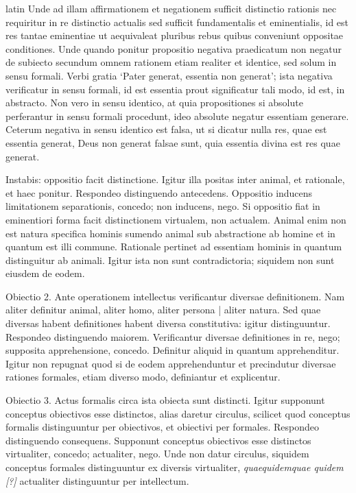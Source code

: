 \begin{otherlanguage*}{latin}
\pstart
 Unde ad illam affirmationem et negationem sufficit distinctio rationis nec requiritur in re distinctio actualis sed sufficit fundamentalis et eminentialis, id est res tantae eminentiae ut aequivaleat pluribus rebus quibus conveniunt oppositae conditiones. Unde quando ponitur propositio negativa  praedicatum non negatur de subiecto secundum omnem rationem etiam realiter et identice, sed solum in sensu formali. Verbi gratia `Pater generat, essentia non generat'; ista negativa verificatur in sensu formali, id est essentia prout significatur tali modo, id est, in abstracto. Non vero in sensu identico, at quia propositiones si absolute perferantur in sensu formali procedunt, ideo absolute negatur essentiam generare. Ceterum negativa in sensu identico est falsa, ut si dicatur nulla res, quae est essentia generat, Deus non generat falsae sunt, quia essentia divina est res quae generat. 
\pend

\pstart
 Instabis: oppositio facit distinctione. Igitur illa positas inter animal, et rationale, et haec ponitur. Respondeo distinguendo antecedens. Oppositio inducens limitationem separationis, concedo; non inducens, nego. Si oppositio fiat in eminentiori forma facit distinctionem virtualem, non actualem. Animal enim non est natura specifica hominis sumendo animal sub abstractione ab homine et in quantum est illi commune. Rationale pertinet ad essentiam hominis in quantum distinguitur ab animali. Igitur ista non sunt contradictoria; siquidem non sunt eiusdem de eodem. 
\pend

\pstart
 Obiectio 2. Ante operationem intellectus verificantur diversae definitionem. Nam aliter definitur animal, aliter homo, aliter persona \textnormal{|} aliter natura. Sed quae diversas habent definitiones habent diversa constitutiva: igitur distinguuntur. Respondeo distinguendo maiorem. Verificantur diversae definitiones in re, nego; supposita apprehensione, concedo. Definitur aliquid in quantum apprehenditur. Igitur non repugnat quod si de eodem apprehenduntur et precindutur diversae rationes formales, etiam diverso modo, definiantur et explicentur. 
\pend

\pstart
 Obiectio 3. Actus formalis circa ista obiecta sunt distincti. Igitur supponunt conceptus obiectivos esse distinctos, alias daretur circulus, scilicet quod conceptus formalis distinguuntur per obiectivos, et obiectivi per formales. Respondeo distinguendo consequens. Supponunt conceptus obiectivos esse distinctos virtualiter, concedo; actualiter, nego. Unde non datur circulus, siquidem conceptus formales distinguuntur ex diversis virtualiter, \emph{quaequidemquae quidem [?]} actualiter distinguuntur per intellectum. 
\pend


\end{otherlanguage*}
